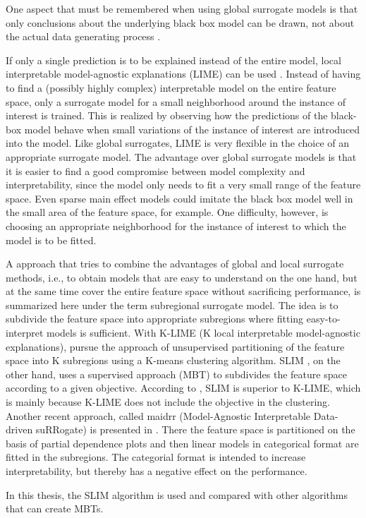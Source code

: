 One aspect that must be remembered when using global surrogate models is that only conclusions about the underlying black box model can be drawn, not about the actual data generating process \citep{Molnar.2019}.


If only a single prediction is to be explained instead of the entire model, local interpretable model-agnostic explanations (LIME) can be used \citep{Ribeiro.2016}. Instead of having to find a (possibly highly complex) interpretable model on the entire feature space, only a surrogate model for a small neighborhood around the instance of interest is trained. This is realized by observing how the predictions of the black-box model behave when small variations of the instance of interest are introduced into the model. Like global surrogates, LIME is very flexible in the choice of an appropriate surrogate model. The advantage over global surrogate models is that it is easier to find a good compromise between model complexity and interpretability, since the model only needs to fit a very small range of the feature space. Even sparse main effect models could imitate the black box model well in the small area of the feature space, for example. One difficulty, however, is choosing an appropriate neighborhood for the instance of interest to which the model is to be fitted.
\citep{Molnar.2019}


A approach that tries to combine the advantages of global and local surrogate methods, i.e., to obtain models that are easy to understand on the one hand, but at the same time cover the entire feature space without sacrificing performance, is summarized here under the term subregional surrogate model.
The idea is to subdivide the feature space into appropriate subregions where fitting easy-to-interpret models is sufficient.
With K-LIME (K local interpretable model-agnostic explanations), \citet{Hall.2017}  pursue the approach of unsupervised partitioning of the feature space into K subregions using a K-means clustering algorithm. 
SLIM \citep{Hu.2020}, on the other hand, uses a supervised approach (MBT) to subdivides the feature space according to a given objective. According to \citep{Hu.2018}, SLIM is superior to K-LIME, which is mainly because K-LIME does not include the objective in the clustering. 
Another recent approach, called maidrr (Model-Agnostic Interpretable Data-driven suRRogate) is presented in \citet{Henckaerts.2022}. There the feature space is partitioned on the basis of partial dependence plots and then linear models in categorical format are fitted in the subregions. The categorial format is intended to increase interpretability, but thereby has a negative effect on the performance.

In this thesis, the SLIM algorithm is used and compared with other algorithms that can create MBTs.

